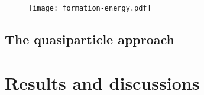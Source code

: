 \begin{figure}
    \centering
    \texttt{[image: formation-energy.pdf]}
    \caption[]{}
    \label{fig:formation-energy}
\end{figure}

\subsection{The quasiparticle approach}

\section{Results and discussions}





